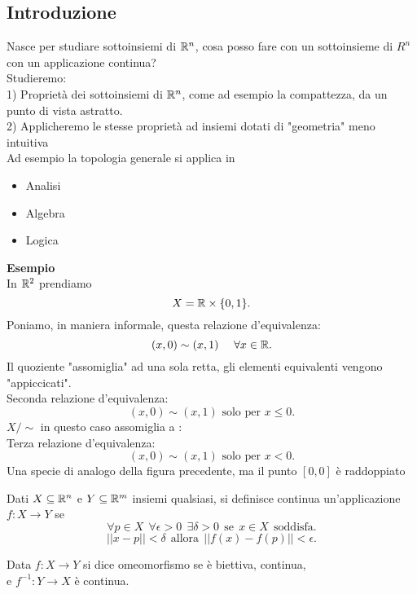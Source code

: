 \documentclass[12px]{article}
\begin{document}
	\subsection{Introduzione}
	Nasce per studiare sottoinsiemi di $\mathbb{R}^n$, cosa posso fare con un sottoinsieme di  $R^n$ con un applicazione continua?\\
	Studieremo:\\
	1) Proprietà dei sottoinsiemi di $\mathbb{R}^n$, come ad esempio la compattezza, da un punto di vista astratto.\\
	2) Applicheremo le stesse proprietà ad insiemi dotati di "geometria" meno intuitiva\\
	Ad esempio la topologia generale si applica in 
	\begin{itemize}
		\item Analisi
		\item Algebra
		\item Logica
	\end{itemize}
	\textbf{Esempio}\\
	In $\mathbb{R}^2$ prendiamo \\
	 \[
		 X = \mathbb{R}\times\{0,1\}
	.\] 
	Poniamo, in maniera informale, questa relazione d'equivalenza:
	\[
		(x,0)\sim (x,1) \ \ \ \ \forall x\in\R
	.\] 
	Il quoziente "assomiglia" ad una sola retta, gli elementi equivalenti vengono "appiccicati".\\
Seconda relazione d'equivalenza:
\[
	(x,0)\sim(x,1) \text{   solo per   } x\leq 0
.\] 
$X/\sim$ in questo caso assomiglia a :\\
Terza relazione d'equivalenza:
\[
	(x,0)\sim (x,1) \text{    solo per    } x < 0
.\] 
Una specie di analogo della figura precedente, ma il punto $[0,0]$ è raddoppiato
\begin{defi}
	Dati $X\subseteq \mathbb{R}^n$ e  $Y\subseteq \mathbb{R}^m$ insiemi qualsiasi, si definisce continua un'applicazione  $f:X \rightarrow Y$ se 
	\[
		\forall p\in X \ \ \forall \epsilon >0\ \ \exists\delta>0\ \  \text {se} \ \ x\in X\ \  \text {soddisfa}
	.\] 
	\[
		||x-p||<\delta \ \ \text{allora} \ \ ||f(x)-f(p)||<\epsilon
	.\] 
\end{defi}
\begin{defi}[Omeomofrismo]
	Data $f: X \rightarrow Y$ si dice omeomorfismo se è biettiva, continua,\\ e $f^{-1} :Y \rightarrow X$ è continua.
\end{defi}
\end{document}
